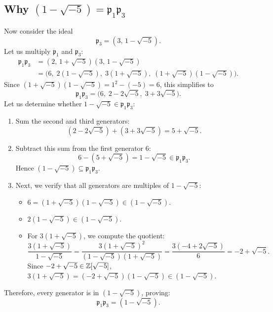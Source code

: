 \documentclass[a4paper]{article}
\begin{document}
\subsection{Why \texorpdfstring{$(1 - \sqrt{-5}) = \mathfrak{p}_1 \mathfrak{p}_3$}{(1 - sqrt(-5)) = p1 p3}}
\label{subsec:p1_p3}
Now consider the ideal
\begin{equation}
 \mathfrak{p}_3 = (3, \, 1 - \sqrt{-5}).
\end{equation}
Let us multiply $\mathfrak{p}_1$ and $\mathfrak{p}_3$:
\begin{align}
 \mathfrak{p}_1 \mathfrak{p}_3 &= (2, \, 1 + \sqrt{-5})(3, \, 1 - \sqrt{-5}) \nonumber\\
 &= \Big(6, \; 2(1 - \sqrt{-5}), \; 3(1 + \sqrt{-5}), \; (1 + \sqrt{-5})(1 - \sqrt{-5})\Big).
\end{align}
Since $(1 + \sqrt{-5})(1 - \sqrt{-5}) = 1^2 - (-5) = 6$, this simplifies to
\begin{equation}
 \mathfrak{p}_1 \mathfrak{p}_3 = \Big(6, \; 2 - 2\sqrt{-5}, \; 3 + 3\sqrt{-5}\Big).
\end{equation}
Let us determine whether $1 - \sqrt{-5} \in \mathfrak{p}_1 \mathfrak{p}_3$:
\begin{enumerate}
 \item Sum the second and third generators:
 \begin{equation}
  (2 - 2\sqrt{-5}) + (3 + 3\sqrt{-5}) = 5 + \sqrt{-5}.
 \end{equation}
 \item Subtract this sum from the first generator $6$:
 \begin{equation}
  6 - (5 + \sqrt{-5}) = 1 - \sqrt{-5} \in \mathfrak{p}_1 \mathfrak{p}_3.
 \end{equation}
 Hence $(1 - \sqrt{-5}) \subseteq \mathfrak{p}_1 \mathfrak{p}_3$.
 \item Next, we verify that all generators are multiples of $1 - \sqrt{-5}$:
 \begin{itemize}
  \item $6 = (1 + \sqrt{-5})(1 - \sqrt{-5}) \in (1 - \sqrt{-5})$.
  \item $2(1 - \sqrt{-5}) \in (1 - \sqrt{-5})$.
  \item For $3(1 + \sqrt{-5})$, we compute the quotient:
  \begin{equation}
   \frac{3(1 + \sqrt{-5})}{1 - \sqrt{-5}} = \frac{3(1 + \sqrt{-5})^2}{(1 - \sqrt{-5})(1 + \sqrt{-5})} = \frac{3(-4 + 2\sqrt{-5})}{6} = -2 + \sqrt{-5}.
  \end{equation}
  Since $-2 + \sqrt{-5} \in \mathbb{Z}[\sqrt{-5}]$, $3(1 + \sqrt{-5}) = (-2 + \sqrt{-5})(1 - \sqrt{-5}) \in (1 - \sqrt{-5})$.
 \end{itemize}
\end{enumerate}
Therefore, every generator is in $(1 - \sqrt{-5})$, proving:
\begin{equation}
 \boxed{\mathfrak{p}_1 \mathfrak{p}_3 = (1 - \sqrt{-5})}.
\end{equation}
\end{document}
